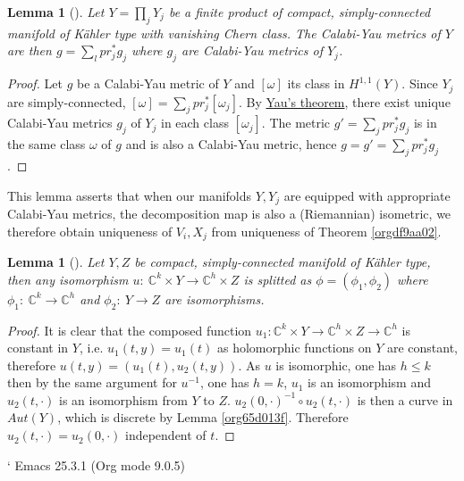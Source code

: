 \documentclass[11pt]{article}
\newtheorem{lemma}[theorem]{Lemma}
\begin{document}
\begin{lemma}[]
Let \(Y = \prod_j Y_j\) be a finite product of compact, simply-connected manifold of Kähler type with vanishing Chern
class. The Calabi-Yau metrics of \(Y\) are then \(g = \sum_l pr_j^*g_j\) where \(g_j\) are Calabi-Yau metrics
of \(Y_j\).
\end{lemma}
\begin{proof}
Let \(g\) be a Calabi-Yau metric of \(Y\) and \([\omega]\) its class in \(H^{1,1}(Y)\). Since \(Y_j\) are
simply-connected, \([\omega] = \sum_j pr_j^* [\omega_j]\). By \href{calabi-yau.org}{Yau's theorem}, there exist unique Calabi-Yau
metrics \(g_j\) of \(Y_j\) in each class \([\omega_j]\). The metric \(g' = \sum_j pr_j^* g_j\) is in the same
class \(\omega\) of \(g\) and is also a Calabi-Yau metric, hence \(g= g' = \sum_j pr_j^*g_j\).
\end{proof}

This lemma asserts that when our manifolds \(Y, Y_j\) are equipped with appropriate Calabi-Yau metrics,
the decomposition map is also a (Riemannian) isometric, we therefore obtain uniqueness of \(V_i, X_j\)
from uniqueness of Theorem \ref{orgdf9aa02}.

\begin{lemma}[]
Let \(Y,Z\) be compact, simply-connected manifold of Kähler type, then any isomorphism \(u:\
\mathbb{C}^k\times Y\longrightarrow \mathbb{C}^h\times Z\) is splitted as \(\phi = (\phi_1,\phi_2)\)
where \(\phi_1:\ \mathbb{C}^k\longrightarrow \mathbb{C}^h\) and \(\phi_2:\ Y\longrightarrow Z\) are
isomorphisms.
\end{lemma}
\begin{proof}
It is clear that the composed function \(u_1: \mathbb{C}^k\times Y \longrightarrow \mathbb{C}^h \times Z
\longrightarrow \mathbb{C}^h\) is constant in \(Y\), i.e. \(u_1(t,y) = u_1(t)\) as holomorphic
functions on \(Y\) are constant, therefore  \(u(t,y) = (u_1(t), u_2(t,y))\). As \(u\) is isomorphic, one
has \(h\leq k\) then by the same argument for \(u^{-1}\), one has \(h=k\), \(u_1\) is an isomorphism and
\(u_2(t,\cdot)\) is an isomorphism from \(Y\) to \(Z\). \(u_2(0,\cdot)^{-1}\circ u_2(t,\cdot)\) is then a curve in
\(Aut(Y)\), which is discrete by Lemma \ref{org65d013f}. Therefore \(u_2(t,\cdot)= u_2(0,\cdot)\) independent of \(t\).
\end{proof}

`
Emacs 25.3.1 (Org mode 9.0.5)
\end{document}
